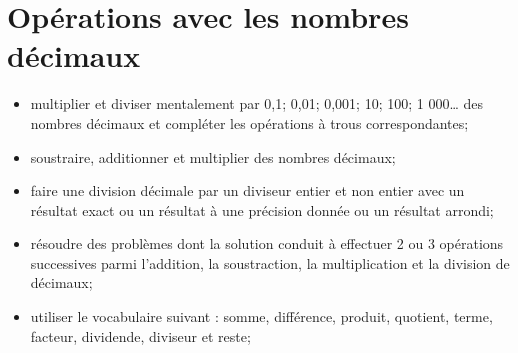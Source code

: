 \chapter{Opérations avec les nombres décimaux}\label{ChOpNbEntDec}

\begin{acquis}
\begin{itemize}
\item multiplier et diviser mentalement par 0,1; 0,01; 0,001; 10; 100; 1 000… des nombres décimaux et compléter les opérations à trous correspondantes;
\item soustraire, additionner et multiplier des nombres décimaux;
\item faire une division décimale par un diviseur entier et non entier avec un résultat exact ou un résultat à une précision donnée ou un résultat arrondi;
\item résoudre des problèmes dont la solution conduit à effectuer 2 ou 3 opérations successives parmi l’addition, la soustraction, la multiplication et la division de décimaux;
\item utiliser le vocabulaire suivant : somme, différence, produit, quotient, terme, facteur, dividende, diviseur et reste;
\end{itemize}
\end{acquis}

\cours


\exercicesbase
\begin{colonne*exercice}

\end{colonne*exercice}


\exercicesappr
\begin{colonne*exercice}

\end{colonne*exercice}

\connaissances


\TravauxPratiques %


\pagebreak

\Recreation



